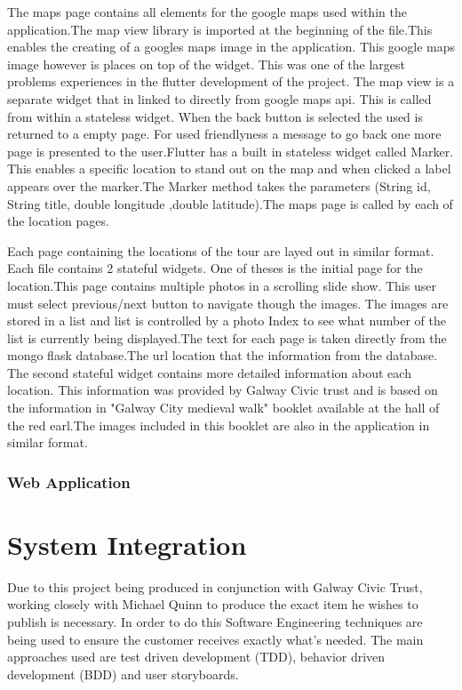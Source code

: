 The maps page contains all elements for the google maps used within the application.The map view library is imported at the beginning of the file.This enables the creating of a googles maps image in the application. This google maps image however is places on top of the widget. This was one of the largest problems experiences in the flutter development of the project. The map view is a separate widget that in linked to directly from google maps api. This is called from within a stateless widget. When the back button is selected the used is returned to a empty page. For used friendlyness a message to go back one more page is presented to the user.Flutter has a built in stateless widget called Marker. This enables a specific location to stand out on the map and when clicked a label appears over the marker.The Marker method takes the parameters (String id, String title, double longitude ,double latitude).The maps page is called by each of the location pages.

Each page containing the locations of the tour are layed out in similar format. Each file contains 2 stateful widgets. One of theses is the initial page for the location.This page contains multiple photos in a scrolling slide show. This user must select previous/next button to navigate though the images. The images are stored in a list and list is controlled by a photo Index to see what number of the list is currently being displayed.The text for each page is taken directly from the mongo flask database.The url location that the information from the database. The second stateful widget contains more detailed information about each location. This information was provided by Galway Civic trust and is based on the information in "Galway City medieval walk" booklet available at the hall of the red earl.The images included in this booklet are also in the application in similar format.

\subsubsection{Web Application}

\section{System Integration}
Due to this project being produced in conjunction with Galway Civic Trust, working closely with Michael Quinn to produce the exact item he wishes to publish is necessary. In order to do this Software Engineering techniques are being used to ensure the customer receives exactly what’s needed. The main approaches used are test driven development (TDD), behavior driven development (BDD) and user storyboards.

